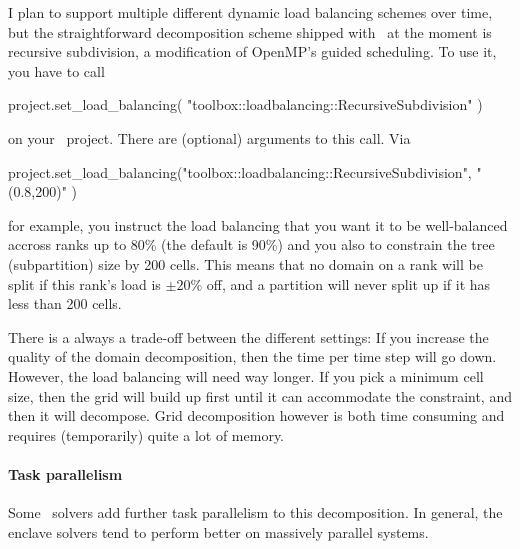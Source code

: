 I plan to support multiple different dynamic load balancing schemes over time,
but the straightforward decomposition scheme shipped with \Peano\ at the moment
is recursive subdivision, a modification of OpenMP's guided scheduling.
To use it, you have to call
\begin{code}
project.set_load_balancing( "toolbox::loadbalancing::RecursiveSubdivision" )
\end{code}

\noindent
on your \ExaHyPE\ project. There are (optional) arguments to this call. Via
\begin{code}
project.set_load_balancing("toolbox::loadbalancing::RecursiveSubdivision", "(0.8,200)" )
\end{code}

\noindent
for example, you instruct the load balancing that you want it to be well-balanced 
accross ranks up to 80\% (the default is 90\%) and you also to constrain the tree (subpartition) size 
by 200 cells.
This means that no domain on a rank will be split if this rank's load is $\pm20\%$ off, and a partition
will never split up if it has less than 200 cells.

\begin{remark}
 There is a always a trade-off between the different settings: 
 If you increase the quality of the domain decomposition, then the time per time step will go down.
 However, the load balancing will need way longer. 
 If you pick a minimum cell size, then the grid will build up first until it can accommodate the constraint, and then it will decompose.
 Grid decomposition however is both time consuming and requires (temporarily) quite a lot of memory.
\end{remark}   
 



\paragraph{Task parallelism}

Some \ExaHyPE\ solvers add further task parallelism to this decomposition. 
In general, the enclave solvers tend to perform better on massively parallel
systems.


% 

